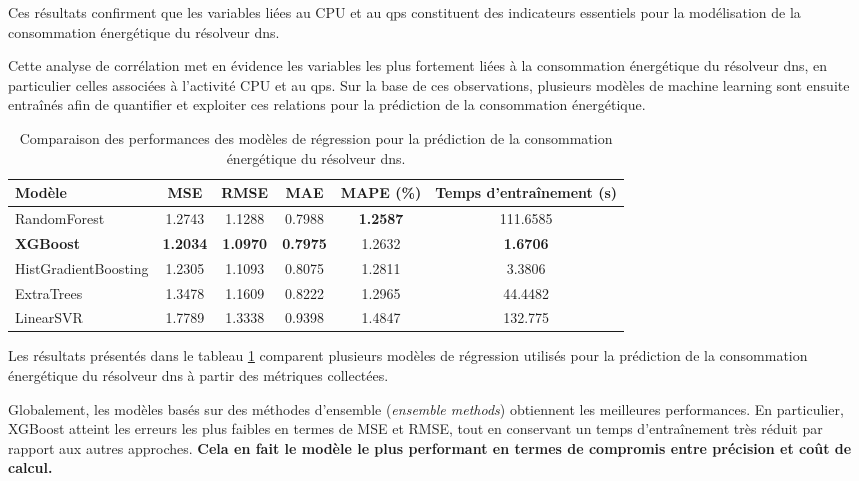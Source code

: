 \documentclass[12pt, a4paper]{report}
\begin{document}
	Ces résultats confirment que les variables liées au CPU et au \gls{qps} constituent des indicateurs essentiels pour la modélisation de la consommation énergétique du résolveur \gls{dns}.

	Cette analyse de corrélation met en évidence les variables les plus fortement liées à la consommation énergétique du résolveur \gls{dns}, en particulier celles associées à l'activité CPU et au \gls{qps}. Sur la base de ces observations, plusieurs modèles de machine learning sont ensuite entraînés afin de quantifier et exploiter ces relations pour la prédiction de la consommation énergétique.

	
	\begin{table}[H]
		\centering
		\small
		\begin{tabular}{lccccc}
			\hline
			\textbf{Modèle} & \textbf{MSE} & \textbf{RMSE} & \textbf{MAE} & \textbf{MAPE (\%)} & \textbf{Temps d'entraînement (s)} \\
			\hline
			RandomForest            & 1.2743 & 1.1288 & 0.7988 & \textbf{1.2587} & 111.6585 \\
			\textbf{XGBoost}        & \textbf{1.2034} & \textbf{1.0970} & \textbf{0.7975} & 1.2632 & \textbf{1.6706} \\
			HistGradientBoosting    & 1.2305 & 1.1093 & 0.8075 & 1.2811 & 3.3806 \\
			ExtraTrees              & 1.3478 & 1.1609 & 0.8222 & 1.2965 & 44.4482 \\
			LinearSVR               & 1.7789 & 1.3338 & 0.9398 & 1.4847 & 132.775 \\
			\hline
		\end{tabular}
		\caption{Comparaison des performances des modèles de régression pour la prédiction de la consommation énergétique du résolveur \gls{dns}.}
		\label{tab:ml_results}
	\end{table}
	
	Les résultats présentés dans le tableau \ref{tab:ml_results} comparent plusieurs modèles de régression utilisés pour la prédiction de la consommation énergétique du résolveur \gls{dns} à partir des métriques collectées.
	
	Globalement, les modèles basés sur des méthodes d'ensemble (\textit{ensemble methods}) obtiennent les meilleures performances. En particulier, XGBoost atteint les erreurs les plus faibles en termes de MSE et RMSE, tout en conservant un temps d'entraînement très réduit par rapport aux autres approches. \textbf{Cela en fait le modèle le plus performant en termes de compromis entre précision et coût de calcul.}
\end{document}
